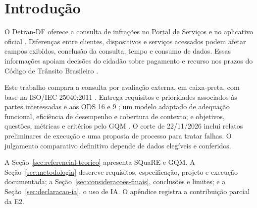 \section{Introdução}
\label{sec:introducao}

O Detran-DF oferece a consulta de infrações no Portal de Serviços \cite{detrandf2026portal} e no aplicativo oficial \cite{detrandf2026app}. Diferenças entre clientes, dispositivos e serviços acessados podem afetar campos exibidos, conclusão da consulta, tempo e consumo de dados. Essas informações apoiam decisões do cidadão sobre pagamento e recurso nos prazos do Código de Trânsito Brasileiro \cite{brasil1997ctb}.

Este trabalho compara a consulta por avaliação externa, em caixa-preta, com base na ISO/IEC 25040:2011 \cite{iso25040_2011}. Entrega requisitos e prioridades associados às partes interessadas e aos ODS 16 e 9 \cite{un2015agenda}; um modelo adaptado de adequação funcional, eficiência de desempenho e cobertura de contexto; e objetivos, questões, métricas e critérios pelo GQM \cite{basili1994gqm}. O corte de 22/11/2026 inclui relatos preliminares de execução e uma proposta de processo para tratar falhas. O julgamento comparativo definitivo depende de dados elegíveis e conferidos.

A Seção~\ref{sec:referencial-teorico} apresenta SQuaRE e GQM. A Seção~\ref{sec:metodologia} descreve requisitos, especificação, projeto e execução documentada; a Seção~\ref{sec:consideracoes-finais}, conclusões e limites; e a Seção~\ref{sec:declaracao-ia}, o uso de IA. O apêndice registra a contribuição parcial da E2.
